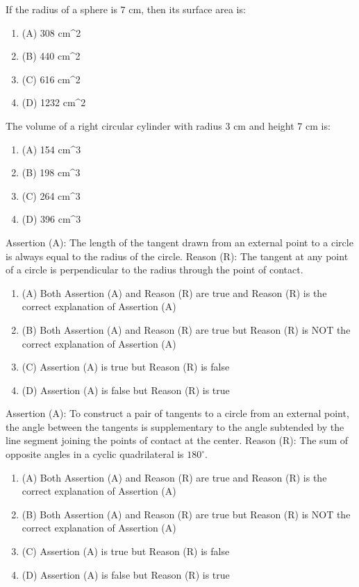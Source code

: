 \documentclass[12pt,a4paper]{exam}
\begin{document}
\begin{questions}
\question[1] If the radius of a sphere is $7 \text{ cm}$, then its surface area is:
\begin{enumerate}[label=(\Alph*)]
  \item (A) 308 cm\textasciicircum{}2
  \item (B) 440 cm\textasciicircum{}2
  \item (C) 616 cm\textasciicircum{}2
  \item (D) 1232 cm\textasciicircum{}2
\end{enumerate}
\vspace{0.15cm}

\question[1] The volume of a right circular cylinder with radius $3 \text{ cm}$ and height $7 \text{ cm}$ is:
\begin{enumerate}[label=(\Alph*)]
  \item (A) 154 cm\textasciicircum{}3
  \item (B) 198 cm\textasciicircum{}3
  \item (C) 264 cm\textasciicircum{}3
  \item (D) 396 cm\textasciicircum{}3
\end{enumerate}
\vspace{0.15cm}

\question[1] Assertion (A): The length of the tangent drawn from an external point to a circle is always equal to the radius of the circle. Reason (R): The tangent at any point of a circle is perpendicular to the radius through the point of contact.
\begin{enumerate}[label=(\Alph*)]
  \item (A) Both Assertion (A) and Reason (R) are true and Reason (R) is the correct explanation of Assertion (A)
  \item (B) Both Assertion (A) and Reason (R) are true but Reason (R) is NOT the correct explanation of Assertion (A)
  \item (C) Assertion (A) is true but Reason (R) is false
  \item (D) Assertion (A) is false but Reason (R) is true
\end{enumerate}
\vspace{0.15cm}

\question[1] Assertion (A): To construct a pair of tangents to a circle from an external point, the angle between the tangents is supplementary to the angle subtended by the line segment joining the points of contact at the center. Reason (R): The sum of opposite angles in a cyclic quadrilateral is $180^\circ$.
\begin{enumerate}[label=(\Alph*)]
  \item (A) Both Assertion (A) and Reason (R) are true and Reason (R) is the correct explanation of Assertion (A)
  \item (B) Both Assertion (A) and Reason (R) are true but Reason (R) is NOT the correct explanation of Assertion (A)
  \item (C) Assertion (A) is true but Reason (R) is false
  \item (D) Assertion (A) is false but Reason (R) is true
\end{enumerate}
\vspace{0.15cm}


\end{questions}
\end{document}
